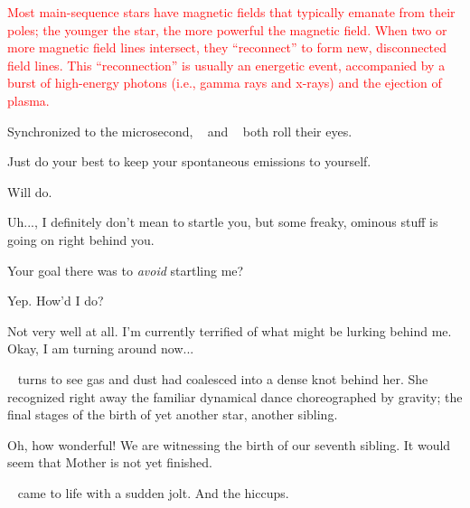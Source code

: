 \documentclass[main.tex]{subfiles}
\begin{document}
\begin{tcolorbox}[sharp corners, colback=red!30, colframe=red!80!blue, title=Reconnection of Magnetic Field Lines]
\par \textcolor{red} {Most main-sequence stars have magnetic fields that typically emanate from their poles; the younger the star, the more powerful the magnetic field.  When two or more magnetic field lines intersect, they ``reconnect'' to form new, disconnected field lines.  This ``reconnection'' is usually an energetic event, accompanied by a burst of high-energy photons (i.e., gamma rays and x-rays) and the ejection of plasma.}   
\end{tcolorbox}

\par \nar Synchronized to the microsecond, \rmmaia~ and \rmsterope~ both roll their eyes.

\par \Maia Just do your best to keep your spontaneous emissions to yourself.

\par \Alcyone Will do. 

\par \Electra Uh...\rmmaia, I definitely don't mean to startle you, but some freaky, ominous stuff is going on right behind you.

\par \Maia Your goal there was to \textit{avoid} startling me?

\par \Electra Yep.  How'd I do?

\par \Maia Not very well at all.  I'm currently terrified of what might be lurking behind me.  Okay, I am turning around now...

\par \nar \rmmaia~ turns to see gas and dust had coalesced into a dense knot behind her.  She recognized right away the familiar dynamical dance choreographed by gravity; the final stages of the birth of yet another star, another sibling.

\par \Maia Oh, how wonderful!  We are witnessing the birth of our seventh sibling.  It would seem that Mother is not yet finished.

\par \nar \rmmerope~ came to life with a sudden jolt.  And the hiccups.  
\end{document}

